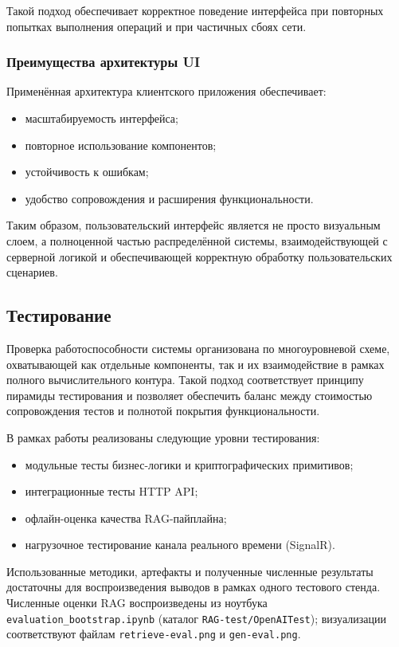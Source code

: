 \documentclass{article}
\begin{document}
Такой подход обеспечивает корректное поведение интерфейса при повторных попытках выполнения операций и при частичных сбоях сети.

\subsubsection{Преимущества архитектуры UI}

Применённая архитектура клиентского приложения обеспечивает:
\begin{itemize}
\item масштабируемость интерфейса;
\item повторное использование компонентов;
\item устойчивость к ошибкам;
\item удобство сопровождения и расширения функциональности.
\end{itemize}

Таким образом, пользовательский интерфейс является не просто визуальным слоем, а полноценной частью распределённой системы, взаимодействующей с серверной логикой и обеспечивающей корректную обработку пользовательских сценариев.
\subsection{Тестирование}

Проверка работоспособности системы организована по многоуровневой схеме, охватывающей как отдельные компоненты, так и их взаимодействие в рамках полного вычислительного контура. Такой подход соответствует принципу пирамиды тестирования и позволяет обеспечить баланс между стоимостью сопровождения тестов и полнотой покрытия функциональности.

В рамках работы реализованы следующие уровни тестирования:
\begin{itemize}
\item модульные тесты бизнес-логики и криптографических примитивов;
\item интеграционные тесты HTTP API;
\item офлайн-оценка качества RAG-пайплайна;
\item нагрузочное тестирование канала реального времени (SignalR).
\end{itemize}

Использованные методики, артефакты и полученные численные результаты достаточны для воспроизведения выводов в рамках одного тестового стенда. Численные оценки RAG воспроизведены из ноутбука \texttt{evaluation\_bootstrap.ipynb} (каталог \texttt{RAG-test/OpenAITest}); визуализации соответствуют файлам \texttt{retrieve-eval.png} и \texttt{gen-eval.png}.
\end{document}
